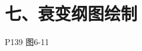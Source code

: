 \documentclass{article}
\begin{document}
\section*{七、衰变纲图绘制}
P139 图6-11
  
  
  
  
  
  
  


\end{document}
